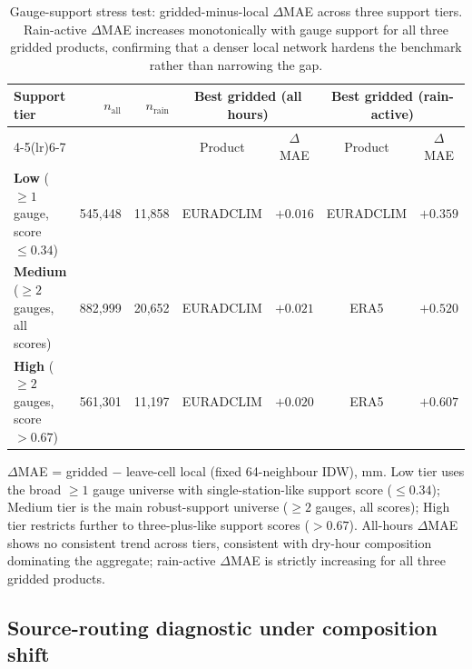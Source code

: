 \documentclass[preprint,12pt]{elsarticle}
\begin{document}
\begin{table}[t]
\centering
\begin{threeparttable}
\caption{Gauge-support stress test: gridded-minus-local $\Delta$MAE across three support tiers. Rain-active $\Delta$MAE increases monotonically with gauge support for all three gridded products, confirming that a denser local network hardens the benchmark rather than narrowing the gap.}
\label{tab:support-stress}
\footnotesize
\setlength{\tabcolsep}{4pt}
\begin{tabular}{lrrcccc}
\toprule
Support tier & $n_\text{all}$ & $n_\text{rain}$ & \multicolumn{2}{c}{Best gridded (all hours)} & \multicolumn{2}{c}{Best gridded (rain-active)} \\
\cmidrule(lr){4-5}\cmidrule(lr){6-7}
& & & Product & $\Delta$MAE & Product & $\Delta$MAE \\
\midrule
\textbf{Low} (${\geq}1$ gauge, score ${\leq}0.34$) & 545,448 & 11,858 & EURADCLIM & $+0.016$ & EURADCLIM & $+0.359$ \\
\textbf{Medium} (${\geq}2$ gauges, all scores) & 882,999 & 20,652 & EURADCLIM & $+0.021$ & ERA5 & $+0.520$ \\
\textbf{High} (${\geq}2$ gauges, score ${>}0.67$) & 561,301 & 11,197 & EURADCLIM & $+0.020$ & ERA5 & $+0.607$ \\
\bottomrule
\end{tabular}
\begin{tablenotes}
\footnotesize
\item $\Delta$MAE = gridded $-$ leave-cell local (fixed 64-neighbour IDW), mm. Low tier uses the broad ${\geq}1$ gauge universe with single-station-like support score (${\leq}0.34$); Medium tier is the main robust-support universe (${\geq}2$ gauges, all scores); High tier restricts further to three-plus-like support scores ($> 0.67$). All-hours $\Delta$MAE shows no consistent trend across tiers, consistent with dry-hour composition dominating the aggregate; rain-active $\Delta$MAE is strictly increasing for all three gridded products.
\end{tablenotes}
\end{threeparttable}
\end{table}

\subsection{Source-routing diagnostic under composition shift}
\end{document}

